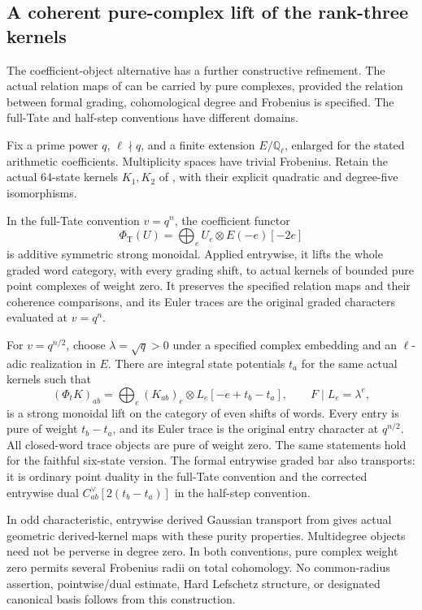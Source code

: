 \subsection{A coherent pure-complex lift of the rank-three kernels}

The coefficient-object alternative has a further constructive
refinement. The actual relation maps of  can be carried
by pure complexes, provided the relation between formal grading,
cohomological degree and Frobenius is specified. The full-Tate
and half-step conventions have different domains.

\begin{finding}
\label{f:purerankthreekernels}
Fix a prime power \(q\), \(\ell\nmid q\), and a finite extension
\(E/\mathbb Q_\ell\), enlarged for the stated arithmetic
coefficients. Multiplicity spaces have trivial Frobenius.
Retain the actual
64-state kernels \(K_1,K_2\) of , with their explicit
quadratic and degree-five isomorphisms.

In the full-Tate convention \(v=q^n\), the coefficient functor
\begin{equation}\label{eq:fullTatekernelLift}
 \Phi_{\mathrm T}(U)
   =\bigoplus_e U_e\otimes E(-e)[-2e]
\end{equation}
is additive symmetric strong monoidal. Applied entrywise, it
lifts the whole graded word category, with every grading shift,
to actual kernels of bounded pure point complexes of weight zero.
It preserves the specified relation maps and their coherence
comparisons, and its Euler traces are the original graded
characters evaluated at \(v=q^n\).

For \(v=q^{n/2}\), choose \(\lambda=\sqrt q>0\) under a specified
complex embedding and an \(\ell\)-adic realization in \(E\).
There are integral state potentials \(t_a\) for the same
actual kernels such that
\begin{equation}\label{eq:halfstepkernelLift}
 (\Phi_tK)_{ab}
   =\bigoplus_e (K_{ab})_e\otimes L_e[-e+t_b-t_a],
 \qquad F\mid L_e=\lambda^e,
\end{equation}
is a strong monoidal lift on the category of even shifts of
words. Every entry is pure of weight \(t_b-t_a\), and its Euler
trace is the original entry character at \(q^{n/2}\).
All closed-word trace objects are pure of weight zero.
The same statements hold for the faithful six-state version.
The formal entrywise graded bar also transports: it is ordinary
point duality in the full-Tate convention and the corrected
entrywise dual \(C_{ab}^\vee[2(t_b-t_a)]\) in the half-step
convention.

In odd characteristic, entrywise derived Gaussian transport
from  gives actual geometric derived-kernel maps with
these purity properties. Multidegree objects need not be
perverse in degree zero. In both conventions, pure complex
weight zero permits several Frobenius radii on total
cohomology. No common-radius assertion, pointwise/dual
estimate, Hard Lefschetz structure, or designated canonical
basis follows from this construction.
\end{finding}

